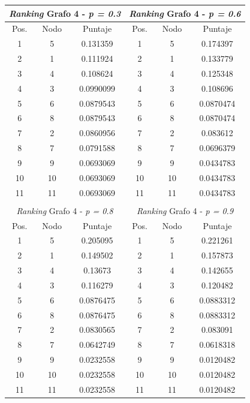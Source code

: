 \begin{center}
         \begin{tabular}{|c|c|c||c|c|c|}
                    \hline
                    \multicolumn{3}{|c||}{\emph{Ranking} Grafo 4 - \emph{p = 0.3}} & \multicolumn{3}{c|}{\emph{Ranking} Grafo 4 - \emph{p = 0.6}} \\ \hline
                    Pos. & Nodo & Puntaje    & Pos. & Nodo & Puntaje  \\ \hline
1 & 5 & 0.131359 & 1 & 5 & 0.174397 \\ 
2 & 1 & 0.111924 & 2 & 1 & 0.133779 \\
3 & 4 & 0.108624  & 3 & 4 & 0.125348 \\
4 & 3 & 0.0990099  & 4 & 3 & 0.108696 \\
5 &  6 & 0.0879543 & 5 & 6 & 0.0870474 \\
6 & 8 & 0.0879543  & 6 & 8 & 0.0870474 \\
7 & 2 & 0.0860956  & 7 & 2 & 0.083612 \\
8 &  7 & 0.0791588 & 8 & 7 & 0.0696379 \\
9 &  9 & 0.0693069 & 9 & 9 & 0.0434783 \\
10 & 10 & 0.0693069  & 10 & 10 & 0.0434783\\
11 & 11 & 0.0693069  & 11 & 11 & 0.0434783 \\ \hline
                    \multicolumn{6}{c}{} \\ \hline
                    \multicolumn{3}{|c||}{\emph{Ranking} Grafo 4 - \emph{p = 0.8}} & \multicolumn{3}{c|}{\emph{Ranking} Grafo 4 - \emph{p = 0.9}} \\ \hline
                    Pos. & Nodo & Puntaje    & Pos. & Nodo & Puntaje  \\ \hline
1 & 5 & 0.205095 & 1 & 5 & 0.221261 \\ 
2 & 1 & 0.149502 & 2 & 1 & 0.157873 \\
3 & 4 & 0.13673  & 3 & 4 & 0.142655 \\
4 & 3 & 0.116279  & 4 & 3 & 0.120482 \\
5 &  6 & 0.0876475 & 5 & 6 & 0.0883312 \\
6 & 8 & 0.0876475 & 6 & 8 & 0.0883312 \\
7 & 2 & 0.0830565  & 7 & 2 & 0.083091 \\
8 &  7 & 0.0642749 & 8 & 7 & 0.0618318 \\
9 &  9 & 0.0232558& 9 & 9 & 0.0120482 \\
10 & 10 & 0.0232558  & 10 & 10 & 0.0120482\\
11 & 11 & 0.0232558  & 11 & 11 & 0.0120482 \\ \hline

                \end{tabular}
            \end{center}
            

